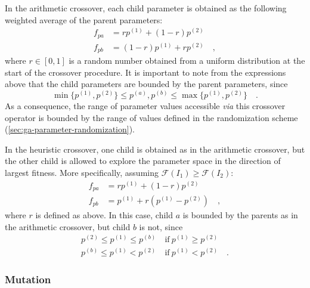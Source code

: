\documentclass[10pt,a4paper,openany]{memoir}
\numberwithin{equation}{section}
\begin{document}
In the arithmetic crossover, each child parameter is obtained as the following
weighted average of the parent parameters:
\begin{align}
  \label{eq:ga-crossover-arithmetic}
  f_{pa} & = rp^{(1)} + (1-r)p^{(2)} \\ \nonumber
  f_{pb} & = (1-r)p^{(1)} + rp^{(2)} \quad ,
\end{align}
where $r \in [0,1]$ is a random number obtained from a uniform distribution at
the start of the crossover procedure.
It is important to note from the expressions above that the child parameters are
bounded by the parent parameters, since
\begin{equation*}
  \min{\{p^{(1)},p^{(2)}\}} \leq p^{(a)},p^{(b)} \leq \max{\{p^{(1)},p^{(2)}\}} \quad .
\end{equation*}
As a consequence, the range of parameter values accessible \textit{via} this crossover operator
is bounded by the range of values defined in the randomization scheme (\autoref{sec:ga-parameter-randomization}).

In the heuristic crossover, one child is obtained as in the arithmetic crossover, but the other
child is allowed to explore the parameter space in the direction of largest fitness. More specifically,
assuming $\mathcal{F}(I_1) \geq \mathcal{F}(I_2)$:
\begin{align}
  \label{eq:ga-crossover-heuristic}
  f_{pa} & = rp^{(1)} + (1-r)p^{(2)} \\ \nonumber
  f_{pb} & = p^{(1)} + r(p^{(1)} - p^{(2)}) \quad ,
\end{align}
where $r$ is defined as above. In this case, child $a$ is bounded by
the parents as in the arithmetic crossover, but child $b$ is not, since
\begin{align*}
  p^{(2)} \leq p^{(1)} \leq p^{(b)} &\ \text{if}\  p^{(1)} \geq p^{(2)} \\
  p^{(b)} \leq p^{(1)} < p^{(2)} &\ \text{if}\  p^{(1)} < p^{(2)} \quad .
\end{align*}

\subsubsection{Mutation}
\label{sec:ga-mutation}
\end{document}

